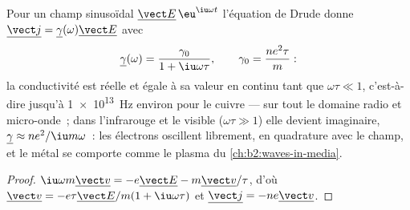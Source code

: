 \begin{proposition}\label{prop:b2:charges-currents-conduction:acdrude}
Pour un champ sinusoïdal $\underline{\vect E}\,\eu^{\iu\omega t}$ l'équation de Drude
donne $\underline{\vect j} = \underline\gamma(\omega)\underline{\vect E}$ avec
\[
\underline\gamma(\omega) = \frac{\gamma_0}{1 + \iu\omega\tau} , \qquad \gamma_0 = \frac{ne^2\tau}{m} :
\]
la conductivité est réelle et égale à sa valeur en continu tant que $\omega\tau
\ll 1$, c'est-à-dire jusqu'à \qty{1e13}{Hz} environ pour le cuivre --- sur tout le domaine
radio et micro-onde~; dans l'infrarouge et le visible ($\omega\tau \gg 1$)
elle devient imaginaire, $\underline\gamma \approx ne^2/\iu m\omega$~: les électrons
oscillent librement, en quadrature avec le champ, et le métal se comporte
comme le plasma du \cref{ch:b2:waves-in-media}.
\end{proposition}

\begin{proof}
$\iu\omega m\underline{\vect v} = -e\underline{\vect E} - m\underline{\vect v}/\tau$, d'où
$\underline{\vect v} = -e\tau\underline{\vect E}/m(1 + \iu\omega\tau)$ et $\underline{\vect j}
= -ne\underline{\vect v}$.
\end{proof}

